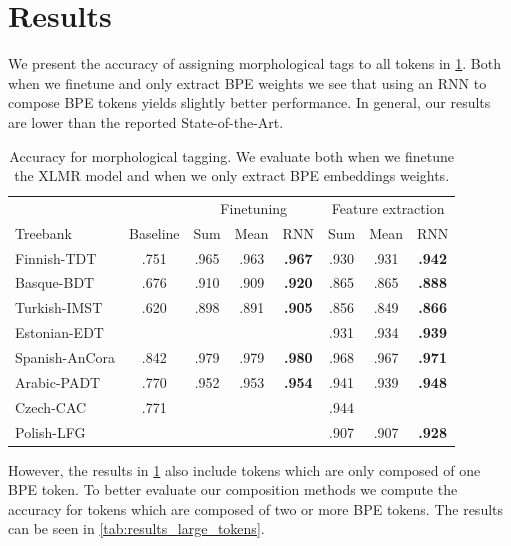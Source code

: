 \documentclass[11pt]{article}
\begin{document}
	
	\section{Results}
	\label{results}
	
	
	
	We present the accuracy of assigning morphological tags to all tokens in \cref{tab:results_tokens}. Both when we finetune and only extract BPE weights we see that using an RNN to compose BPE tokens yields slightly better performance.
	In general, our results are lower than the reported State-of-the-Art.
	

	\begin{table}[h]
	\centering
	\begin{tabular}{l|c|ccc|ccc}
		& & \multicolumn{3}{c}{Finetuning} & \multicolumn{3}{c}{Feature extraction} \\
		Treebank & Baseline & Sum & Mean & RNN & Sum & Mean & RNN \\
		\hline
		Finnish-TDT & .751 & .965 & .963 & \textbf{.967} & .930 & .931 & \textbf{.942} \\ 
		Basque-BDT & .676 & .910 & .909 & \textbf{.920} & .865 & .865 & \textbf{.888} \\
		Turkish-IMST & .620 & .898 & .891 & \textbf{.905} & .856 & .849 & \textbf{.866}\\
		Estonian-EDT & & & & & .931 & .934 & \textbf{.939} \\
		Spanish-AnCora & .842 & .979 & .979 & \textbf{.980} & .968 & .967 & \textbf{.971} \\
		Arabic-PADT & .770 & .952 & .953&\textbf{.954} & .941 & .939 & \textbf{.948} \\
		Czech-CAC & .771 &  &  &  & .944 &  &  \\
		Polish-LFG & & & &  & .907 & .907 & \textbf{.928} \\
	\end{tabular}
	\caption{\label{tab:results_tokens} Accuracy for morphological tagging. We evaluate both when we finetune the XLMR model and when we only extract BPE embeddings weights.}
	\end{table}

	However, the results in \cref{tab:results_tokens} also include tokens which are only composed of one BPE token. To better evaluate our composition methods we compute the accuracy for tokens which are composed of two or more BPE tokens. The results can be seen in \cref{tab:results_large_tokens}.
\end{document}

